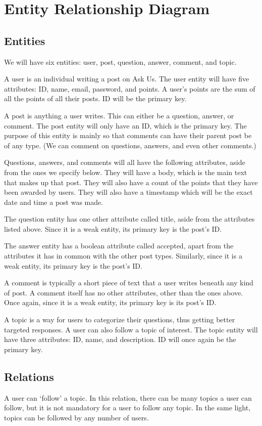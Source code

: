\section{Entity Relationship Diagram}
\subsection{Entities}
We will have six entities: user, post, question, answer, comment, and topic.

A user is an individual writing a post on Ask Us. The user entity will have five attributes: ID, name, email, password, and points. A user's points are the sum of all the points of all their posts. ID will be the primary key.

A post is anything a user writes. This can either be a question, answer, or comment. The post entity will only have an ID, which is the primary key. The purpose of this entity is mainly so that comments can have their parent post be of any type. (We can comment on questions, answers, and even other comments.)

Questions, answers, and comments will all have the following attributes, aside from the ones we specify below. They will have a body, which is the main text that makes up that post. They will also have a count of the points that they have been awarded by users. They will also have a timestamp which will be the exact date and time a post was made.

The question entity has one other attribute called title, aside from the attributes listed above. Since it is a weak entity, its primary key is the post's ID.

The answer entity has a boolean attribute called accepted, apart from the attributes it has in common with the other post types. Similarly, since it is a weak entity, its primary key is the post's ID.

A comment is typically a short piece of text that a user writes beneath any kind of post. A comment itself has no other attributes, other than the ones above. Once again, since it is a weak entity, its primary key is its post's ID.

A topic is a way for users to categorize their questions, thus getting better targeted responses. A user can also follow a topic of interest. The topic entity will have three attributes: ID, name, and description. ID will once again be the primary key.

\subsection{Relations}
A user can `follow' a topic. In this relation, there can be many topics a user can follow, but it is not mandatory for a user to follow any topic. In the same light, topics can be followed by any number of users.

